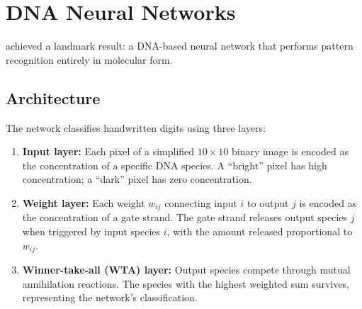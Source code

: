 \section{DNA Neural Networks}
\label{sec:dna-neural-networks}

\citet{cherry2018} achieved a landmark result: a DNA-based neural network that performs pattern recognition entirely in molecular form.

\subsection{Architecture}

The network classifies handwritten digits using three layers:

\begin{enumerate}[leftmargin=1.8em]
  \item \textbf{Input layer:} Each pixel of a simplified $10 \times 10$ binary image is encoded as the concentration of a specific DNA species. A ``bright'' pixel has high concentration; a ``dark'' pixel has zero concentration.
  \item \textbf{Weight layer:} Each weight $w_{ij}$ connecting input $i$ to output $j$ is encoded as the concentration of a gate strand. The gate strand releases output species $j$ when triggered by input species $i$, with the amount released proportional to $w_{ij}$.
  \item \textbf{Winner-take-all (WTA) layer:} Output species compete through mutual annihilation reactions. The species with the highest weighted sum survives, representing the network's classification.
\end{enumerate}

